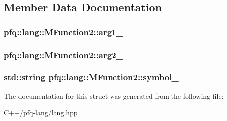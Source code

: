 \subsection{Member Data Documentation}
\hypertarget{structpfq_1_1lang_1_1MFunction2_a0093c5b459cb597f34588894f5105e6b}{
\subsubsection[{arg1\+\_\+}]{ pfq\+::lang\+::\+M\+Function2\+::arg1\+\_\+}}\label{structpfq_1_1lang_1_1MFunction2_a0093c5b459cb597f34588894f5105e6b}
\hypertarget{structpfq_1_1lang_1_1MFunction2_a5f2a3278cdc59b6560ea02e7f9ead5ab}{
\subsubsection[{arg2\+\_\+}]{ pfq\+::lang\+::\+M\+Function2\+::arg2\+\_\+}}\label{structpfq_1_1lang_1_1MFunction2_a5f2a3278cdc59b6560ea02e7f9ead5ab}
\hypertarget{structpfq_1_1lang_1_1MFunction2_afdd71c7aed6b8f5f801bfd6c98f7274d}{
\subsubsection[{symbol\+\_\+}]{\setlength{\rightskip}{0pt plus 5cm}std\+::string pfq\+::lang\+::\+M\+Function2\+::symbol\+\_\+}}\label{structpfq_1_1lang_1_1MFunction2_afdd71c7aed6b8f5f801bfd6c98f7274d}


The documentation for this struct was generated from the following file\+:\begin{DoxyCompactItemize}
\item 
C++/pfq-\/lang/\hyperlink{lang_8hpp}{lang.\+hpp}\end{DoxyCompactItemize}
